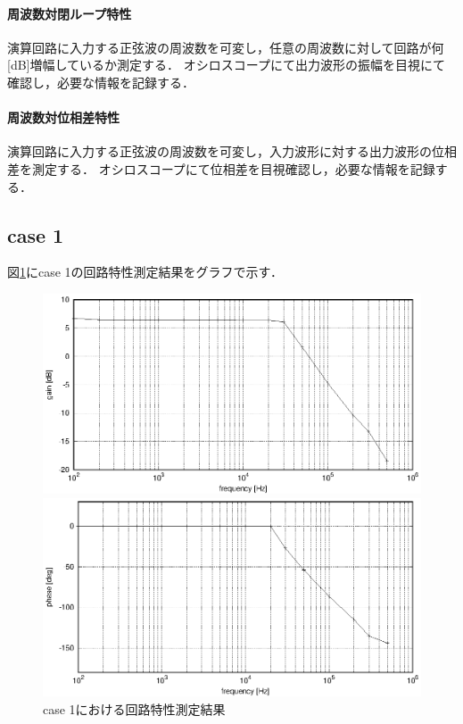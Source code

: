 \documentclass[dvipdfmx,titlepage,a4j]{jsarticle}  %
\begin{document}
\paragraph{周波数対閉ループ特性}
演算回路に入力する正弦波の周波数を可変し，任意の周波数に対して回路が何[dB]増幅しているか測定する．
オシロスコープにて出力波形の振幅を目視にて確認し，必要な情報を記録する．

\paragraph{周波数対位相差特性}
演算回路に入力する正弦波の周波数を可変し，入力波形に対する出力波形の位相差を測定する．
オシロスコープにて位相差を目視確認し，必要な情報を記録する．

\subsection{case 1}
図\ref{fig:gr:case1}にcase 1の回路特性測定結果をグラフで示す．
\begin{figure}[H]
  \centering
  \begin{minipage}{8cm}
    \centering
    \includegraphics[keepaspectratio, scale=0.6]{../data/case1-g.eps}
  \end{minipage}
  \begin{minipage}{8cm}
    \centering
    \includegraphics[keepaspectratio, scale=0.6]{../data/case1-f.eps}
  \end{minipage}
  \caption{case 1における回路特性測定結果}
  \label{fig:gr:case1}
\end{figure}
\end{document}
